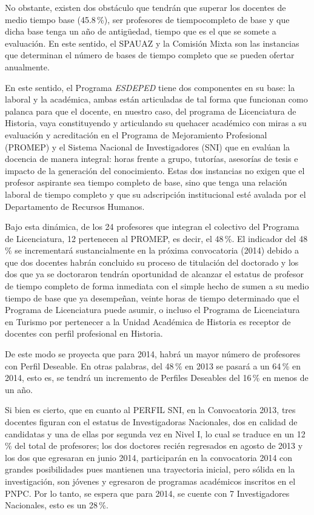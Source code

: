  
No obstante, existen dos obstáculo que tendrán que superar los docentes de
medio tiempo base (45.8\,\%), ser profesores de tiempo\linebreak completo de base y
que dicha base tenga un año de antigüedad, tiempo que es el que se somete a
evaluación. En este sentido, el SPAUAZ y la Comisión Mixta son las
instancias que determinan el número de bases de tiempo completo que se
pueden ofertar anualmente. 

 
En este sentido, el Programa \textit{ESDEPED} tiene dos componentes en su
base: la laboral y la académica, ambas están articuladas de tal forma que
funcionan como palanca para que el docente, en nuestro caso, del programa
de Licenciatura de Historia, vaya constituyendo y articulando su quehacer
académico con miras a su evaluación y acreditación en el Programa de
Mejoramiento Profesional (PROMEP) y el Sistema Nacional de Investigadores
(SNI) que en evalúan la docencia de manera integral: horas frente a grupo,
tutorías, asesorías de tesis e impacto de la generación del conocimiento.
Estas dos instancias no exigen que el profesor aspirante sea tiempo
completo de base, sino que tenga una relación laboral de tiempo completo y
que su adscripción institucional esté avalada por el Departamento de
Recursos Humanos. 

 
Bajo esta dinámica, de los 24 profesores que integran el colectivo del
Programa de Licenciatura, 12 pertenecen al PROMEP, es decir, el 48\,\%. El
indicador del 48\,\% se incrementará sustancialmente en la próxima
convocatoria (2014) debido a que dos docentes habrán concluido su proceso
de titulación del doctorado y los dos que ya se doctoraron tendrán
oportunidad de alcanzar el estatus de profesor de tiempo completo de forma
inmediata con el simple hecho de sumen a su medio tiempo de base que ya
desempeñan, veinte horas de tiempo determinado que el Programa de
Licenciatura puede asumir, o incluso el Programa de Licenciatura en Turismo
 por pertenecer a la Unidad Académica de Historia es receptor de docentes
con perfil profesional en Historia. 

 
De este modo se proyecta que para 2014, habrá un mayor número de profesores con
Perfil Deseable. En otras palabras, del 48\,\% en 2013 se pasará a un 64\,\%
en 2014, esto es, se tendrá un incremento de Perfiles Deseables del 16\,\% en
menos de un año.

 
Si bien es cierto, que en cuanto al PERFIL SNI, en la Convocatoria 2013,
tres docentes figuran con el estatus de Investigadoras Nacionales, dos en
calidad de candidatas y una de ellas por segunda vez en Nivel I, lo cual se
traduce en un 12\,\% del total de profesores; los dos doctores recién
regresados en agosto de 2013 y los dos que egresaran en junio 2014,
participarán en la convocatoria 2014 con grandes posibilidades pues
mantienen una trayectoria inicial, pero sólida en la investigación, son
jóvenes y egresaron de programas académicos inscritos en el PNPC. Por lo
tanto, se espera que para 2014, se cuente con 7 Investigadores Nacionales,
esto es un 28\,\%.

